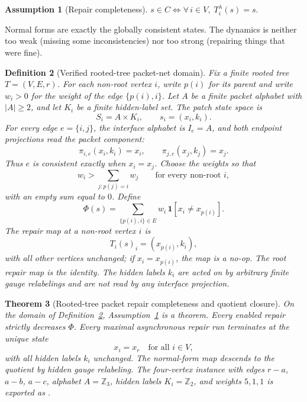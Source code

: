 \documentclass[11pt]{article}
\newtheorem{theorem}{Theorem}[section]
\newtheorem{definition}[theorem]{Definition}
\newtheorem{assumption}[theorem]{Assumption}
\theoremstyle{remark}
\theoremstyle{plain}
\begin{document}
\begin{assumption}[Repair completeness]\label{ass:complete}
$s\in C \iff \forall\, i\in V,\; T_i^\lambda(s)=s.$
\end{assumption}

Normal forms are exactly the globally consistent states. The dynamics is neither too weak (missing some inconsistencies) nor too strong (repairing things that were fine).

\begin{definition}[Verified rooted-tree packet-net domain]\label{def:tree-packet-domain}
Fix a finite rooted tree \(T=(V,E,r)\). For each non-root vertex \(i\), write \(p(i)\) for its
parent and write \(w_i>0\) for the weight of the edge \(\{p(i),i\}\). Let \(A\) be a finite
packet alphabet with \(|A|\ge2\), and let \(K_i\) be a finite hidden-label set. The patch state
space is
\[
S_i=A\times K_i,
\qquad
s_i=(x_i,k_i).
\]
For every edge \(e=\{i,j\}\), the interface alphabet is \(I_e=A\), and both endpoint projections
read the packet component:
\[
\pi_{i,e}(x_i,k_i)=x_i,
\qquad
\pi_{j,e}(x_j,k_j)=x_j.
\]
Thus \(e\) is consistent exactly when \(x_i=x_j\). Choose the weights so that
\[
w_i>\sum_{j:p(j)=i}w_j
\qquad
\text{for every non-root } i,
\]
with an empty sum equal to \(0\). Define
\[
\Phi(s)=\sum_{\{p(i),i\}\in E}w_i\,\mathbf 1[x_i\ne x_{p(i)}].
\]
The repair map at a non-root vertex \(i\) is
\[
T_i(s)_i=(x_{p(i)},k_i),
\]
with all other vertices unchanged; if \(x_i=x_{p(i)}\), the map is a no-op. The root repair map is
the identity. The hidden labels \(k_i\) are acted on by arbitrary finite gauge relabelings and are
not read by any interface projection.
\end{definition}

\begin{theorem}[Rooted-tree packet repair completeness and quotient closure]\label{thm:tree-packet-domain}
On the domain of Definition~\ref{def:tree-packet-domain}, Assumption~\ref{ass:complete} is a
theorem. Every enabled repair strictly decreases \(\Phi\). Every maximal asynchronous repair run
terminates at the unique state
\[
x_i=x_r\quad\text{for all }i\in V,
\]
with all hidden labels \(k_i\) unchanged. The normal-form map descends to the quotient by hidden
gauge relabeling. The four-vertex instance with edges \(r\!-\!a\), \(a\!-\!b\), \(a\!-\!c\),
alphabet \(A=\mathbb Z_3\), hidden labels \(K_i=\mathbb Z_2\), and weights \(5,1,1\) is exported
as .
\end{theorem}
\end{document}
